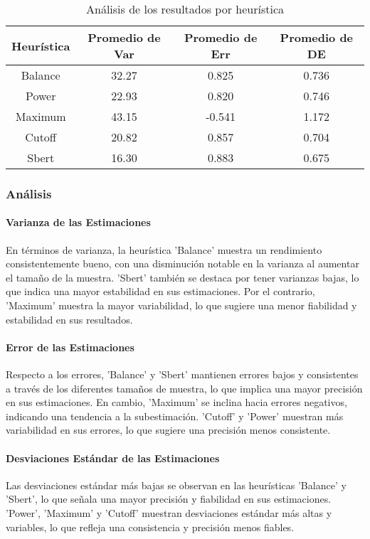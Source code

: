 \documentclass{article}
\begin{document}
\begin{table}[H]
\centering
\label{table:heuristic_analysis}
\begin{tabular}{|c|c|c|c|}
\hline
\textbf{Heurística} & \textbf{Promedio de Var} & \textbf{Promedio de Err} & \textbf{Promedio de DE} \\ \hline
Balance & 32.27 & 0.825 & 0.736 \\ \hline
Power & 22.93 & 0.820 & 0.746 \\ \hline
Maximum & 43.15 & -0.541 & 1.172 \\ \hline
Cutoff & 20.82 & 0.857 & 0.704 \\ \hline
Sbert & 16.30 & 0.883 & 0.675 \\ \hline
\end{tabular}
\caption{Análisis de los resultados por heurística}
\end{table}


\subsubsection{Análisis}

\paragraph{Varianza de las Estimaciones}
En términos de varianza, la heurística 'Balance' muestra un rendimiento consistentemente bueno, con una disminución notable en la varianza al aumentar el tamaño de la muestra. 'Sbert' también se destaca por tener varianzas bajas, lo que indica una mayor estabilidad en sus estimaciones. Por el contrario, 'Maximum' muestra la mayor variabilidad, lo que sugiere una menor fiabilidad y estabilidad en sus resultados.


\paragraph{Error de las Estimaciones}
Respecto a los errores, 'Balance' y 'Sbert' mantienen errores bajos y consistentes a través de los diferentes tamaños de muestra, lo que implica una mayor precisión en sus estimaciones. En cambio, 'Maximum' se inclina hacia errores negativos, indicando una tendencia a la subestimación. 'Cutoff' y 'Power' muestran más variabilidad en sus errores, lo que sugiere una precisión menos consistente.

\paragraph{Desviaciones Estándar de las Estimaciones}
Las desviaciones estándar más bajas se observan en las heurísticas 'Balance' y 'Sbert', lo que señala una mayor precisión y fiabilidad en sus estimaciones. 'Power', 'Maximum' y 'Cutoff' muestran desviaciones estándar más altas y variables, lo que refleja una consistencia y precisión menos fiables.
\end{document}
